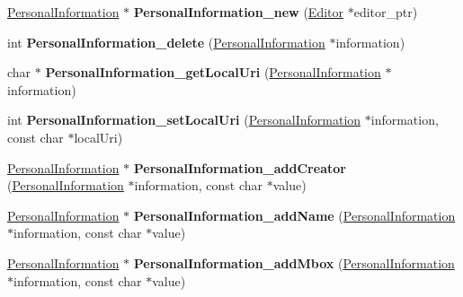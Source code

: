 \begin{DoxyCompactItemize}
\mbox{\label{namespaceomexmeta_a119fbc0317a5af631e7f68caece8c70b}} 
\hyperlink{classomexmeta_1_1PersonalInformation}{Personal\+Information} $\ast$ {\bfseries Personal\+Information\+\_\+new} (\hyperlink{classomexmeta_1_1Editor}{Editor} $\ast$editor\+\_\+ptr)
\item 
\mbox{\label{namespaceomexmeta_a5dcd490456bde3f95069f91e65c2b042}} 
int {\bfseries Personal\+Information\+\_\+delete} (\hyperlink{classomexmeta_1_1PersonalInformation}{Personal\+Information} $\ast$information)
\item 
\mbox{\label{namespaceomexmeta_a9db9c9c591926b3e9061b2ca7cb4541f}} 
char $\ast$ {\bfseries Personal\+Information\+\_\+get\+Local\+Uri} (\hyperlink{classomexmeta_1_1PersonalInformation}{Personal\+Information} $\ast$information)
\item 
\mbox{\label{namespaceomexmeta_af1ed67bfbe5c55b04c5164030f9f5fef}} 
int {\bfseries Personal\+Information\+\_\+set\+Local\+Uri} (\hyperlink{classomexmeta_1_1PersonalInformation}{Personal\+Information} $\ast$information, const char $\ast$local\+Uri)
\item 
\mbox{\label{namespaceomexmeta_a46f59a8d3104d824826d5dd104d55393}} 
\hyperlink{classomexmeta_1_1PersonalInformation}{Personal\+Information} $\ast$ {\bfseries Personal\+Information\+\_\+add\+Creator} (\hyperlink{classomexmeta_1_1PersonalInformation}{Personal\+Information} $\ast$information, const char $\ast$value)
\item 
\mbox{\label{namespaceomexmeta_af1ab848f3e3f81ab4dbc822c84aab92e}} 
\hyperlink{classomexmeta_1_1PersonalInformation}{Personal\+Information} $\ast$ {\bfseries Personal\+Information\+\_\+add\+Name} (\hyperlink{classomexmeta_1_1PersonalInformation}{Personal\+Information} $\ast$information, const char $\ast$value)
\item 
\mbox{\label{namespaceomexmeta_a30bf0fbfd78a23a0e2d87e1cb981cc8a}} 
\hyperlink{classomexmeta_1_1PersonalInformation}{Personal\+Information} $\ast$ {\bfseries Personal\+Information\+\_\+add\+Mbox} (\hyperlink{classomexmeta_1_1PersonalInformation}{Personal\+Information} $\ast$information, const char $\ast$value)

\end{DoxyCompactItemize}
